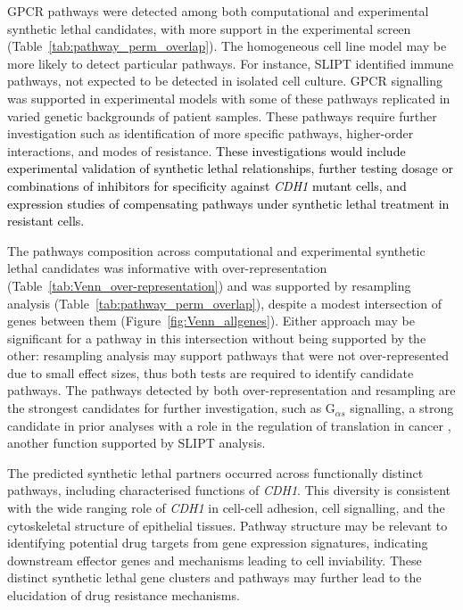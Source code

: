 \gls{GPCR} \glspl{pathway} were detected among both computational and experimental \gls{synthetic lethal} candidates, with more support in the experimental screen (Table~\ref{tab:pathway_perm_overlap}). The homogeneous cell line model may be more likely to detect particular \glspl{pathway}. For instance, \gls{SLIPT} identified immune \glspl{pathway}, not expected to be detected in isolated cell culture. \gls{GPCR} signalling was supported in experimental models \cite{Telford2015} with some of these \glspl{pathway} replicated in varied genetic backgrounds of patient samples. These \glspl{pathway} require further investigation such as identification of more specific \glspl{pathway}, higher\textcolor{black}{-}order interactions, and modes of resistance. \textcolor{black}{These investigations would include experimental validation of synthetic lethal relationships, further testing dosage or combinations of inhibitors for specificity against \textit{CDH1} mutant cells, and expression studies of compensating pathways under synthetic lethal treatment in resistant cells.}

The \glspl{pathway} composition across computational and experimental \gls{synthetic lethal} candidates was informative with over-represent\-ation (Table~\ref{tab:Venn_over-representation}) and was supported by resampling analysis (Table~\ref{tab:pathway_perm_overlap}), despite a modest intersection of genes between them (Figure~\ref{fig:Venn_allgenes}).
Either approach may be significant for a \gls{pathway} in this intersection without being supported by the other: resampling analysis may support \glspl{pathway} that were not over-represent\-ed due to small effect sizes, thus both tests are required to identify candidate \glspl{pathway}.
The \glspl{pathway} detected by both over-represent\-ation and resampling are the strongest candidates for further investigation, such as G$_{\alpha s}$ signalling, a strong candidate in prior analyses with a role in the regulation of translation in cancer \cite{Gao2015}, another function supported by \gls{SLIPT} analysis.

The predicted \gls{synthetic lethal} partners occurred across functionally distinct \glspl{pathway}, including characterised functions of \textit{CDH1}. This diversity is consistent with the wide ranging role of \textit{CDH1} in cell-cell adhesion, cell signalling, and the cytoskeletal structure of epithelial tissues. Pathway structure may be relevant to identifying potential drug targets from \gls{gene expression} signatures, indicating downstream effector genes and mechanisms leading to cell inviability. These distinct \gls{synthetic lethal} gene clusters and \glspl{pathway} may further lead to the elucidation of drug resistance mechanisms.

